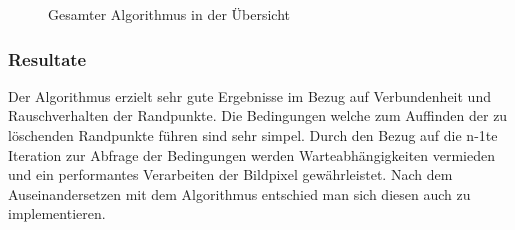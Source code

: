 \begin{figure}[!ht]
  \centering
   \caption{Gesamter Algorithmus in der Übersicht}
\end{figure}
\FloatBarrier
\subsubsection{Resultate}


Der Algorithmus erzielt sehr gute Ergebnisse im Bezug auf Verbundenheit und Rauschverhalten der Randpunkte. Die Bedingungen welche zum Auffinden der zu löschenden Randpunkte führen sind sehr simpel. Durch den Bezug auf die n-1te Iteration zur Abfrage der Bedingungen werden Warteabhängigkeiten vermieden und ein performantes Verarbeiten der Bildpixel gewährleistet.
Nach dem Auseinandersetzen mit dem Algorithmus entschied man sich diesen auch zu implementieren.

\newpage
